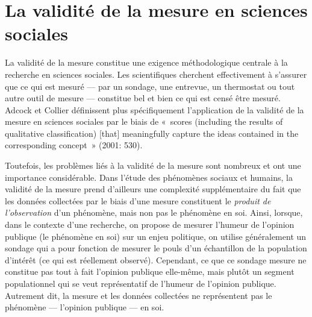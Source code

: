 \documentclass[
  letterpaper,
]{scrbook}
\begin{document}
\hypertarget{la-validituxe9-de-la-mesure-en-sciences-sociales}{%
\section{La validité de la mesure en sciences
sociales}\label{la-validituxe9-de-la-mesure-en-sciences-sociales}}

La validité de la mesure constitue une exigence méthodologique centrale
à la recherche en sciences sociales. Les scientifiques cherchent
effectivement à s'assurer que ce qui est mesuré --- par un sondage, une
entrevue, un thermostat ou tout autre outil de mesure --- constitue bel
et bien ce qui est censé être mesuré. Adcock et Collier définissent plus
spécifiquement l'application de la validité de la mesure en sciences
sociales par le biais de «~scores (including the results of qualitative
classification) {[}that{]} meaningfully capture the ideas contained in
the corresponding concept~» (2001: 530).

Toutefois, les problèmes liés à la validité de la mesure sont nombreux
et ont une importance considérable. Dans l'étude des phénomènes sociaux
et humains, la validité de la mesure prend d'ailleurs une complexité
supplémentaire du fait que les données collectées par le biais d'une
mesure constituent le \emph{produit de l'observation} d'un phénomène,
mais non pas le phénomène en soi. Ainsi, lorsque, dans le contexte d'une
recherche, on propose de mesurer l'humeur de l'opinion publique (le
phénomène en soi) sur un enjeu politique, on utilise généralement un
sondage qui a pour fonction de mesurer le pouls d'un échantillon de la
population d'intérêt (ce qui est réellement observé). Cependant, ce que
ce sondage mesure ne constitue pas tout à fait l'opinion publique
elle-même, mais plutôt un segment populationnel qui se veut
représentatif de l'humeur de l'opinion publique. Autrement dit, la
mesure et les données collectées ne représentent pas le phénomène ---
l'opinion publique --- en soi.
\end{document}
